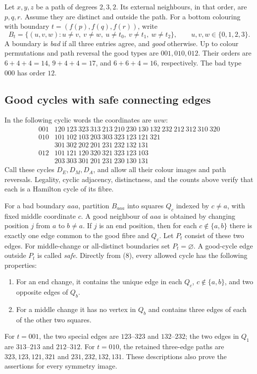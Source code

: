 \documentclass[11pt]{article}
\theoremstyle{remark}
\numberwithin{equation}{section}
\begin{document}
Let $x,y,z$ be a path of degrees $2,3,2$.  Its external neighbours, in
that order, are $p,q,r$.  Assume they are distinct and outside the path.
For a bottom colouring with boundary $t=(f(p),f(q),f(r))$, write
\[
 B_t=\{(u,v,w):u\ne v,\ v\ne w,\ u\ne t_0,\ v\ne t_1,
                  \ w\ne t_2\},\qquad u,v,w\in\{0,1,2,3\}.
\]
A boundary is \emph{bad} if all three entries agree, and \emph{good}
otherwise. Up to colour permutations and path reversal the good types
are $001,010,012$. Their orders are $6+4+4=14$, $9+4+4=17$, and
$6+6+4=16$, respectively. The bad type $000$ has order $12$.

\subsection{Good cycles with safe connecting edges}
In the following cyclic words the coordinates are $uvw$:
\[
\begin{array}{c|l}
001&120\ 123\ 323\ 313\ 213\ 210\ 230\ 130\ 132\ 232\ 212\ 312\ 310\ 320\\[2pt]
010&101\ 102\ 103\ 203\ 303\ 323\ 123\ 121\ 321\\
   &301\ 302\ 202\ 201\ 231\ 232\ 132\ 131\\[2pt]
012&101\ 121\ 120\ 320\ 321\ 323\ 123\ 103\\
   &203\ 303\ 301\ 201\ 231\ 230\ 130\ 131
\end{array}                                                     \tag{8}
\]
Call these cycles $D_E,D_M,D_A$, and allow all their colour images and
path reversals. Legality, cyclic adjacency, distinctness, and the counts
above verify that each is a Hamilton cycle of its fibre.

For a bad boundary $aaa$, partition $B_{aaa}$ into squares $Q_c$ indexed
by $c\ne a$, with fixed middle coordinate $c$. A good neighbour of
$aaa$ is obtained by changing position $j$ from $a$ to $b\ne a$.
If $j$ is an end position, then for each $c\notin\{a,b\}$ there is
exactly one edge common to the good fibre and $Q_c$. Let $P_t$ consist
of these two edges. For middle-change or all-distinct boundaries set
$P_t=\varnothing$. A good-cycle edge outside $P_t$ is called \emph{safe}.
Directly from (8), every allowed cycle has the following properties:
\begin{enumerate}
\item For an end change, it contains the unique edge in each
      $Q_c$, $c\notin\{a,b\}$, and two opposite edges of $Q_b$.
\item For a middle change it has no vertex in $Q_b$ and contains
      three edges of each of the other two squares.
\end{enumerate}
For $t=001$, the two special edges are $123$--$323$ and $132$--$232$;
the two edges in $Q_1$ are $313$--$213$ and $212$--$312$.
For $t=010$, the retained three-edge paths are
$323,123,121,321$ and $231,232,132,131$.
These descriptions also prove the assertions for every symmetry image.
\end{document}
